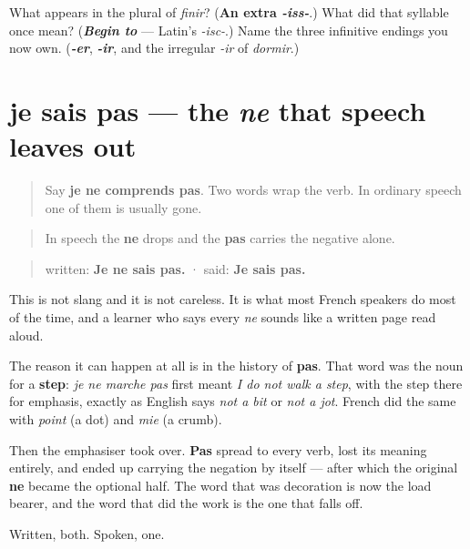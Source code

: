 \begin{tcolorbox}[breakable,colback=teal!4,colframe=teal!35!black,title={Before you move on}]
What appears in the plural of \emph{finir}? (\textbf{An extra \emph{-iss-}}.) What did that syllable once mean? (\emph{\textbf{Begin to}} — Latin's \emph{-isc-}.) Name the three infinitive endings you now own. (\emph{\textbf{-er}}, \emph{\textbf{-ir}}, and the irregular \emph{-ir} of \emph{dormir}.)
\end{tcolorbox}
\section[je sais pas]{je sais pas — the \emph{ne} that speech leaves out}

\label{lesson:FR-C37-ne-chute}



\begin{quote}
Say \textbf{je ne comprends pas}. Two words wrap the verb. In ordinary speech one of them is usually gone.
\end{quote}

\begin{cousinweb}
\begin{quote}
In speech the \textbf{ne} drops and the \textbf{pas} carries the negative alone.
\end{quote}

\begin{quote}
written: \textbf{Je ne sais pas.} · said: \textbf{Je sais pas.}
\end{quote}

This is not slang and it is not careless. It is what most French speakers do most of the time, and a learner who says every \emph{ne} sounds like a written page read aloud.

The reason it can happen at all is in the history of \textbf{pas}. That word was the noun for a \textbf{step}: \emph{je ne marche pas} first meant \emph{I do not walk a step}, with the step there for emphasis, exactly as English says \emph{not a bit} or \emph{not a jot}. French did the same with \emph{point} (a dot) and \emph{mie} (a crumb).

Then the emphasiser took over. \textbf{Pas} spread to every verb, lost its meaning entirely, and ended up carrying the negation by itself — after which the original \textbf{ne} became the optional half. The word that was decoration is now the load bearer, and the word that did the work is the one that falls off.

Written, both. Spoken, one.
\end{cousinweb}

